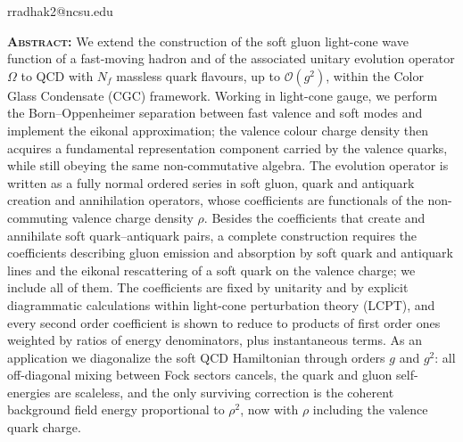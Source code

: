 \documentclass[11pt,a4paper]{article}
\numberwithin{equation}{section}
\newcommand{\OM}{\Omega}
\newcommand{\order}[1]{\mathcal{O}(#1)}
\newcommand{\Nf}{N_{f}}
\begin{document}
\thispagestyle{plain}
\vspace{1.4cm}


\vspace{0.9cm}

\vspace{0.25cm}

\vspace{0.25cm}
 {\small\ttfamily rradhak2@ncsu.edu}

\vspace{0.8cm}
\noindent\textbf{\scshape Abstract:} We extend the construction of the soft gluon light-cone
wave function of a fast-moving hadron and of the associated unitary evolution operator $\OM$ to
QCD with $\Nf$ massless quark flavours, up to $\order{g^{2}}$, within the Color Glass
Condensate (CGC) framework. Working in light-cone gauge, we perform the Born--Oppenheimer
separation between fast valence and soft modes and implement the eikonal approximation; the
valence colour charge density then acquires a fundamental representation component carried by
the valence quarks, while still obeying the same non-commutative algebra. The evolution
operator is written as a fully normal ordered series in soft gluon, quark and antiquark creation
and annihilation operators, whose coefficients are functionals of the non-commuting valence
charge density $\rho$. Besides the coefficients that create and annihilate soft
quark--antiquark pairs, a complete construction requires the coefficients describing gluon
emission and absorption by soft quark and antiquark lines and the eikonal rescattering of a
soft quark on the valence charge; we include all of them. The coefficients are fixed by
unitarity and by explicit diagrammatic calculations within light-cone perturbation theory
(LCPT), and every second order coefficient is shown to reduce to products of first order ones
weighted by ratios of energy denominators, plus instantaneous terms. As an application we
diagonalize the soft QCD Hamiltonian through orders $g$ and $g^{2}$: all off-diagonal mixing
between Fock sectors cancels, the quark and gluon self-energies are scaleless, and the only
surviving correction is the coherent background field energy proportional to $\rho^{2}$, now
with $\rho$ including the valence quark charge.
\end{document}
